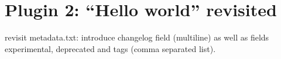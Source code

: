 \section{Plugin 2: ``Hello world'' revisited}
\label{sect:plugin_2}
revisit metadata.txt: introduce changelog field (multiline) as well as fields experimental, deprecated and tags (comma separated list).
